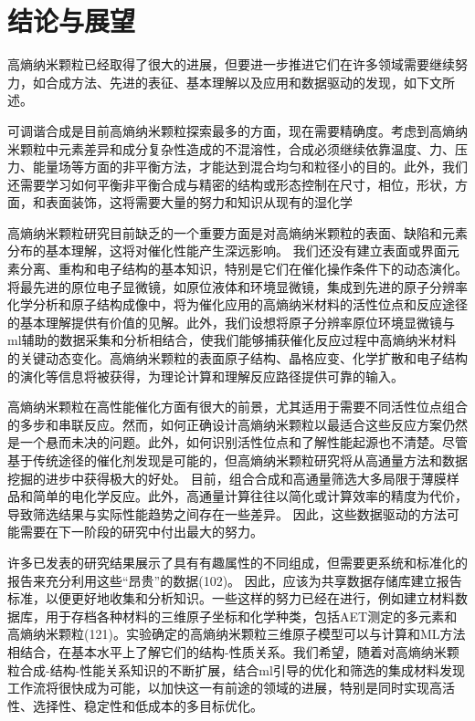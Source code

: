 \documentclass[a4paper]{article}
\begin{document}
\section*{结论与展望}
高熵纳米颗粒已经取得了很大的进展，但要进一步推进它们在许多领域需要继续努力，如合成方法、先进的表征、基本理解以及应用和数据驱动的发现，如下文所述。

可调谐合成是目前高熵纳米颗粒探索最多的方面，现在需要精确度。考虑到高熵纳米颗粒中元素差异和成分复杂性造成的不混溶性，合成必须继续依靠温度、力、压力、能量场等方面的非平衡方法，才能达到混合均匀和粒径小的目的。此外，我们还需要学习如何平衡非平衡合成与精密的结构或形态控制在尺寸，相位，形状，方面，和表面装饰，这将需要大量的努力和知识从现有的湿化学



高熵纳米颗粒研究目前缺乏的一个重要方面是对高熵纳米颗粒的表面、缺陷和元素分布的基本理解，这将对催化性能产生深远影响。
我们还没有建立表面或界面元素分离、重构和电子结构的基本知识，特别是它们在催化操作条件下的动态演化。将最先进的原位电子显微镜，如原位液体和环境显微镜，集成到先进的原子分辨率化学分析和原子结构成像中，将为催化应用的高熵纳米材料的活性位点和反应途径的基本理解提供有价值的见解。此外，我们设想将原子分辨率原位环境显微镜与ml辅助的数据采集和分析相结合，使我们能够捕获催化反应过程中高熵纳米材料的关键动态变化。高熵纳米颗粒的表面原子结构、晶格应变、化学扩散和电子结构的演化等信息将被获得，为理论计算和理解反应路径提供可靠的输入。



高熵纳米颗粒在高性能催化方面有很大的前景，尤其适用于需要不同活性位点组合的多步和串联反应。然而，如何正确设计高熵纳米颗粒以最适合这些反应方案仍然是一个悬而未决的问题。此外，如何识别活性位点和了解性能起源也不清楚。尽管基于传统途径的催化剂发现是可能的，但高熵纳米颗粒研究将从高通量方法和数据挖掘的进步中获得极大的好处。
目前，组合合成和高通量筛选大多局限于薄膜样品和简单的电化学反应。此外，高通量计算往往以简化或计算效率的精度为代价，导致筛选结果与实际性能趋势之间存在一些差异。
因此，这些数据驱动的方法可能需要在下一阶段的研究中付出最大的努力。


许多已发表的研究结果展示了具有有趣属性的不同组成，但需要更系统和标准化的报告来充分利用这些“昂贵”的数据(102)。
因此，应该为共享数据存储库建立报告标准，以便更好地收集和分析知识。一些这样的努力已经在进行，例如建立材料数据库，用于存档各种材料的三维原子坐标和化学种类，包括AET测定的多元素和高熵纳米颗粒(121)。实验确定的高熵纳米颗粒三维原子模型可以与计算和ML方法相结合，在基本水平上了解它们的结构-性质关系。我们希望，随着对高熵纳米颗粒合成-结构-性能关系知识的不断扩展，结合ml引导的优化和筛选的集成材料发现工作流将很快成为可能，以加快这一有前途的领域的进展，特别是同时实现高活性、选择性、稳定性和低成本的多目标优化。
\end{document}
